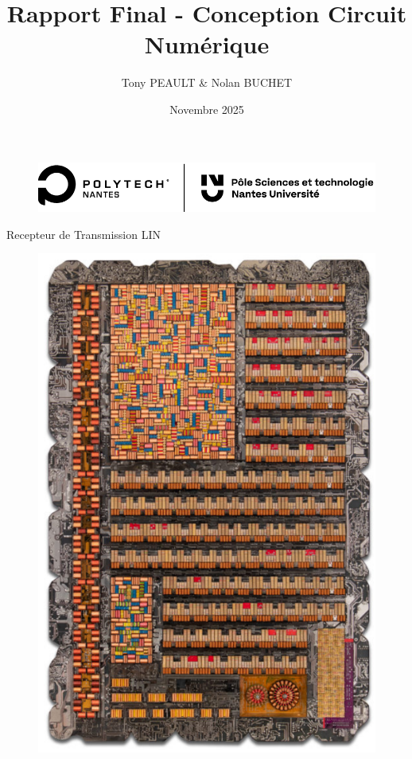 \documentclass{article}
\title{Rapport Final - Conception Circuit Numérique}
\author{Tony PEAULT \& Nolan BUCHET}
\date{Novembre 2025}
\begin{document}
\maketitle

\begin{figure}[H]
    \centering
    \includegraphics[width=1\linewidth]{Graphix/Polytech_Univ.png}
\end{figure}

\vspace{10pt}

\begin{center}
        {\Huge Recepteur de Transmission LIN}
\end{center}

\vspace{10pt}

\begin{figure}[H]
    \centering
    \includegraphics[width=0.4\linewidth]{Image_Base.png}
\end{figure}

\thispagestyle{empty} 


\tableofcontents

























\listoffigures
\end{document}
